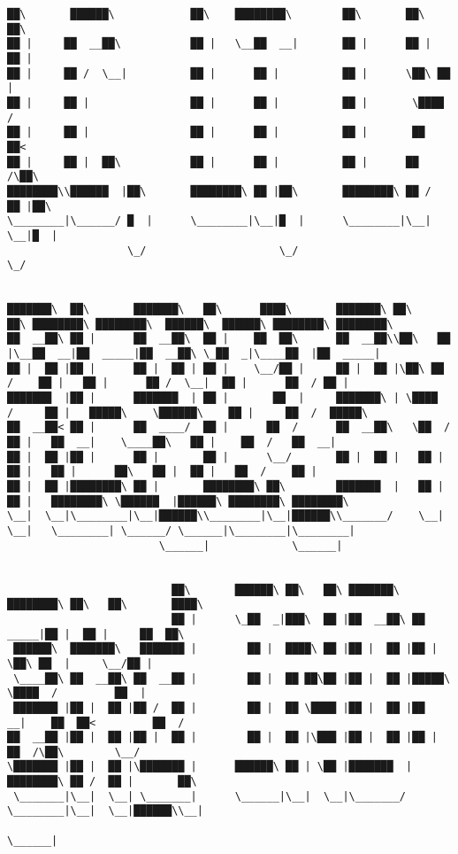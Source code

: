 \documentclass[varwidth=\maxdimen,margin=0.5cm,multi={verbatim}]{standalone}
\begin{document}
\begin{verbatim}
██\       ██████\            ██\    ████████\        ██\       ██\   ██\
██ |     ██  __██\           ██ |   \__██  __|       ██ |      ██ |  ██ |
██ |     ██ /  \__|          ██ |      ██ |          ██ |      \██\ ██  |
██ |     ██ |                ██ |      ██ |          ██ |       \████  /
██ |     ██ |                ██ |      ██ |          ██ |       ██  ██<
██ |     ██ |  ██\           ██ |      ██ |          ██ |      ██  /\██\
████████\\██████  |██\       ████████\ ██ |██\       ████████\ ██ /  ██ |██\
\________|\______/ █  |      \________|\__|█  |      \________|\__|  \__|█  |
                   \_/                     \_/                           \_/


███████\  ██\       ███████\   ██\      ████\       ███████\ ██\     ██\ ████████\ ████████\  ██████\  ██████\ ████████\ ████████\
██  __██\ ██ |      ██  __██\  ██ |    ██  ██\      ██  __██\\██\   ██  |\__██  __|██  _____|██  __██\ \_██  _|\____██  |██  _____|
██ |  ██ |██ |      ██ |  ██ | ██ |    \__/██ |     ██ |  ██ |\██\ ██  /    ██ |   ██ |      ██ /  \__|  ██ |      ██  / ██ |
███████  |██ |      ███████  | ██ |       ██  |     ███████\ | \████  /     ██ |   █████\    \██████\    ██ |     ██  /  █████\
██  __██< ██ |      ██  ____/  ██ |      ██  /      ██  __██\   \██  /      ██ |   ██  __|    \____██\   ██ |    ██  /   ██  __|
██ |  ██ |██ |      ██ |       ██ |      \__/       ██ |  ██ |   ██ |       ██ |   ██ |      ██\   ██ |  ██ |   ██  /    ██ |
██ |  ██ |████████\ ██ |       ████████\ ██\        ███████  |   ██ |       ██ |   ████████\ \██████  |██████\ ████████\ ████████\
\__|  \__|\________|\__|██████\\________|\__|██████\\_______/    \__|       \__|   \________| \______/ \______|\________|\________|
                        \______|             \______|


                          ██\       ██████\ ██\   ██\ ███████\  ████████\ ██\   ██\       ████\
                          ██ |      \_██  _|███\  ██ |██  __██\ ██  _____|██ |  ██ |     ██  ██\
 ██████\  ███████\   ███████ |        ██ |  ████\ ██ |██ |  ██ |██ |      \██\ ██  |     \__/██ |
 \____██\ ██  __██\ ██  __██ |        ██ |  ██ ██\██ |██ |  ██ |█████\     \████  /         ██  |
 ███████ |██ |  ██ |██ /  ██ |        ██ |  ██ \████ |██ |  ██ |██  __|    ██  ██<         ██  /
██  __██ |██ |  ██ |██ |  ██ |        ██ |  ██ |\███ |██ |  ██ |██ |      ██  /\██\        \__/
\███████ |██ |  ██ |\███████ |      ██████\ ██ | \██ |███████  |████████\ ██ /  ██ |       ██\
 \_______|\__|  \__| \_______|      \______|\__|  \__|\_______/ \________|\__|  \__|██████\\__|
                                                                                    \______|


\end{verbatim}
\end{document}
